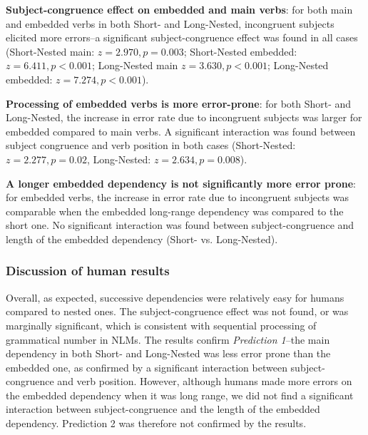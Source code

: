 \begin{APAitemize}
    \item \textbf{Subject-congruence effect on embedded and main verbs}: for both main and embedded verbs in both Short- and Long-Nested, incongruent subjects elicited more errors--a significant subject-congruence effect was found in all cases (Short-Nested main: $z=2.970, p=0.003$; Short-Nested embedded: $z=6.411, p<0.001$; Long-Nested main $z=3.630, p<0.001$; Long-Nested embedded: $z=7.274, p<0.001$).
    \item \textbf{Processing of embedded verbs is more error-prone}: for both Short- and Long-Nested, the increase in error rate due to incongruent subjects was larger for embedded compared to main verbs. A significant interaction was found between subject congruence and verb position in both cases (Short-Nested: $z=2.277, p = 0.02$, Long-Nested: $z=2.634, p = 0.008$).
    \item \textbf{A longer embedded dependency is not significantly more error prone}: for embedded verbs, the increase in error rate due to incongruent subjects was comparable when the embedded long-range dependency was compared to the short one. No significant interaction was found between subject-congruence and length of the embedded dependency (Short- vs. Long-Nested).
\end{APAitemize}

\subsubsection{Discussion of human results}
Overall, as expected, successive dependencies were relatively easy for humans compared to nested ones. 
The subject-congruence effect was not found, or was marginally significant, which is consistent with sequential processing of grammatical number in NLMs. The results confirm \textit{Prediction 1}--the main dependency in both Short- and Long-Nested was less error prone than the embedded one, as confirmed by a significant interaction between subject-congruence and verb position. However, although humans made more errors on the embedded dependency when it was long range, we did not find a significant interaction between subject-congruence and the length of the embedded dependency. Prediction 2 was therefore not confirmed by the results.
